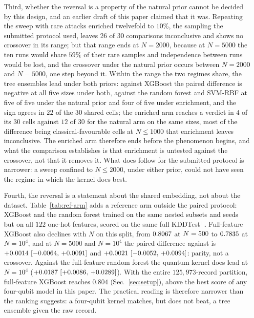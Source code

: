 \begin{revbody}
Third, whether the reversal is a property of the natural prior cannot be
decided by this design, and an earlier draft of this paper claimed that it was.
Repeating the sweep with rare attacks enriched twelvefold to $10\%$, the
sampling the submitted protocol used, leaves $26$ of $30$ comparisons
inconclusive and shows no crossover in its range; but that range ends at
$N=2000$, because at $N=5000$ the ten runs would share $59\%$ of their rare
samples and independence between runs would be lost, and the crossover under
the natural prior occurs between $N=2000$ and $N=5000$, one step beyond it.
Within the range the two regimes share, the tree ensembles lead under both
priors: against XGBoost the paired difference is negative at all five sizes
under both, against the random forest and SVM-RBF at five of five under the
natural prior and four of five under enrichment, and the sign agrees in $22$ of
the $30$ shared cells; the enriched arm reaches a verdict in $4$ of its $30$
cells against $12$ of $30$ for the natural arm on the same sizes, most of the
difference being classical-favourable cells at $N\leq1000$ that enrichment
leaves inconclusive. The enriched arm therefore ends before the phenomenon begins, and
what the comparison establishes is that enrichment is untested against the
crossover, not that it removes it. What does follow for the submitted protocol
is narrower: a sweep confined to $N\leq2000$, under either prior, could not have
seen the regime in which the kernel does best.

Fourth, the reversal is a statement about the shared embedding, not about the
dataset. Table~\ref{tab:ref-arm} adds a reference arm outside the paired
protocol: XGBoost and the random forest trained on the same nested subsets and
seeds but on all $122$ one-hot features, scored on the same full KDDTest$^+$.
Full-feature XGBoost also declines with $N$ on this split, from
$0.8067$ at $N=500$ to $0.7835$ at $N=10^4$, and at
$N=5000$ and $N=10^4$ the paired difference against \QSVM{} is
$\refArmDeltaXgbFiveK$ and $\refArmDeltaXgbTenK$: parity, not a crossover.
Against the full-feature random forest the quantum kernel does lead at
$N=10^4$ ($\refArmDeltaRfTenK$). With the entire $125{,}973$-record partition,
full-feature XGBoost reaches $0.804$ (Sec.~\ref{sec:setup}), above the best
score of any four-qubit model in this paper. The practical reading is
therefore narrower than the ranking suggests: a four-qubit kernel matches, but
does not beat, a tree ensemble given the raw record.

\end{revbody}

